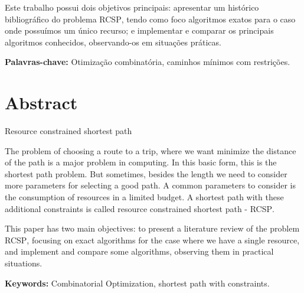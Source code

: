 \documentclass[12pt,twoside,a4paper]{book}
\begin{document}
Este trabalho possui dois objetivos principais: apresentar um histórico 
bibliográfico do problema \textsc{RCSP}, tendo como foco algoritmos exatos para 
o caso onde possuímos um único recurso; e implementar e comparar os 
principais algoritmos conhecidos, observando-os em situações práticas.

\noindent \textbf{Palavras-chave:} Otimização combinatória, caminhos 
mínimos com restrições.

\chapter*{Abstract}

\begin{center}
  \Large{Resource constrained shortest path}
\end{center}



The problem of choosing a route to a trip, where we want
minimize the distance of the path is a major problem in
computing. In this basic form, this is the shortest path problem. But 
sometimes, besides the length we need to consider more  
parameters for selecting a good path. A common parameters
to consider is the consumption of resources in a limited budget. A 
shortest path with these additional constraints is called resource 
constrained shortest path - \textsc{RCSP}.

This paper has two main objectives: to present a literature review of 
the problem \textsc{RCSP}, focusing on exact algorithms for
the case where we have a single resource, and implement and compare
some algorithms, observing them in practical situations.

\noindent \textbf{Keywords:} Combinatorial Optimization, shortest path 
with constraints.

\tableofcontents    %

\end{document}
